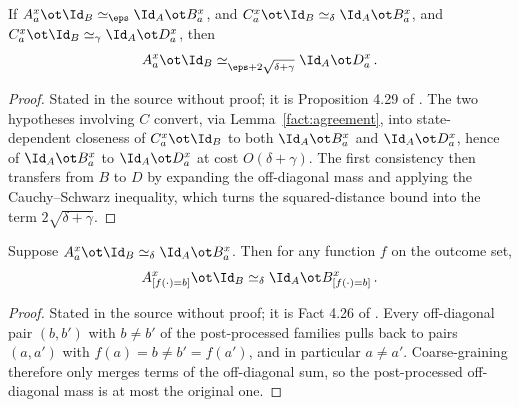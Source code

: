 \begin{lemma}\label{fact:triangle-for-simeq}
	\leanok
	If $A^x_a \ot \Id_B \simeq_{\eps} \Id_A \ot B^x_a$, and $C^x_a \ot \Id_B \simeq_\delta \Id_A \ot B^x_a$, and $C^x_a \ot \Id_B \simeq_\gamma \Id_A \ot D^x_a$, then
	\[
		A^x_a \ot \Id_B \simeq_{\eps + 2\sqrt{\delta+\gamma}} \Id_A \ot D^x_a\,.
	\]
\end{lemma}
\begin{proof}
	\leanok
	Stated in the source without proof; it is Proposition 4.29 of \cite{Ji2020LowIndividualDegree}. The two hypotheses involving $C$ convert, via Lemma~\ref{fact:agreement}, into state-dependent closeness of $C^x_a \ot \Id_B$ to both $\Id_A \ot B^x_a$ and $\Id_A \ot D^x_a$, hence of $\Id_A \ot B^x_a$ to $\Id_A \ot D^x_a$ at cost $O(\delta+\gamma)$. The first consistency then transfers from $B$ to $D$ by expanding the off-diagonal mass and applying the Cauchy--Schwarz inequality, which turns the squared-distance bound into the term $2\sqrt{\delta+\gamma}$.
\end{proof}

\begin{lemma}\label{fact:data-processing}
	\leanok
	Suppose $A^x_a \ot \Id_B \simeq_\delta \Id_A \ot B^x_a$. Then for any function $f$ on the outcome set,
	\[
		A^x_{[f(\cdot)=b]} \ot \Id_B \simeq_\delta \Id_A \ot B^x_{[f(\cdot)=b]}\,.
	\]
\end{lemma}
\begin{proof}
	\leanok
	Stated in the source without proof; it is Fact 4.26 of \cite{Natarajan2018NEEXP}. Every off-diagonal pair $(b, b')$ with $b \ne b'$ of the post-processed families pulls back to pairs $(a, a')$ with $f(a) = b \ne b' = f(a')$, and in particular $a \ne a'$. Coarse-graining therefore only merges terms of the off-diagonal sum, so the post-processed off-diagonal mass is at most the original one.
\end{proof}


